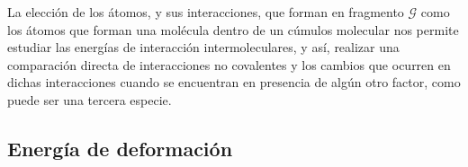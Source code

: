 %

La elección de los átomos, y sus interacciones, que forman en fragmento
$\mathscr{G}$ como los átomos que forman una molécula dentro de un cúmulos
molecular nos permite estudiar las energías de interacción intermoleculares, y
así, realizar una comparación directa de interacciones no covalentes y los
cambios que ocurren en dichas interacciones cuando se encuentran en presencia
de algún otro factor, como puede ser una tercera especie.

\subsection{Energía de deformación}

